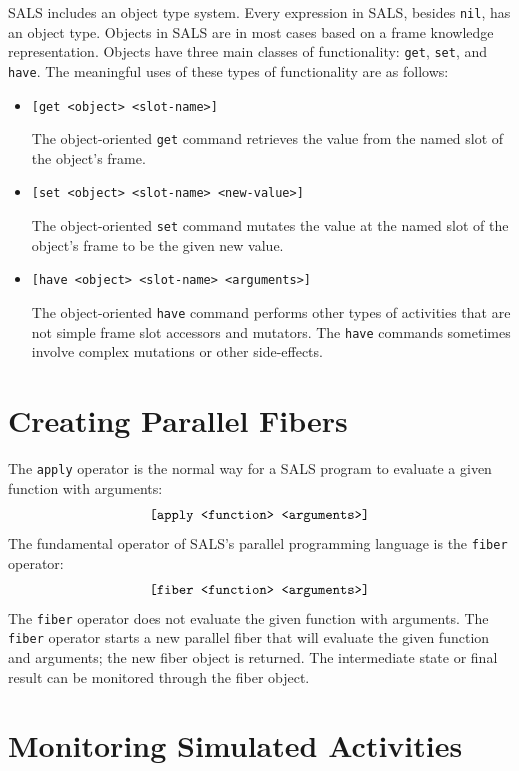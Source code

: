 SALS includes an object type system.  Every expression in SALS,
besides {\tt nil}, has an object type.  Objects in SALS are in most
cases based on a frame knowledge representation.  Objects have three
main classes of functionality: {\tt get}, {\tt set}, and {\tt have}.
The meaningful uses of these types of functionality are as follows:
\begin{itemize}
\item {\tt [get <object> <slot-name>]}

The object-oriented {\tt get} command retrieves the value from the
named slot of the object's frame.
\item {\tt [set <object> <slot-name> <new-value>]}

The object-oriented {\tt set} command mutates the value at the named
slot of the object's frame to be the given new value.
\item {\tt [have <object> <slot-name> <arguments>]}

The object-oriented {\tt have} command performs other types of
activities that are not simple frame slot accessors and mutators.  The
{\tt have} commands sometimes involve complex mutations or other
side-effects.
\end{itemize}




\section{Creating Parallel Fibers}

The {\tt apply} operator is the normal way for a SALS program to
evaluate a given function with arguments:
\begin{equation*}
\text{\tt [apply <function> <arguments>]}
\end{equation*}
The fundamental operator of SALS's parallel programming language is
the {\tt fiber} operator:
\begin{equation*}
\text{\tt [fiber <function> <arguments>]}
\end{equation*}
The {\tt fiber} operator does not evaluate the given function with
arguments.  The {\tt fiber} operator starts a new parallel fiber that
will evaluate the given function and arguments; the new fiber object
is returned.  The intermediate state or final result can be monitored
through the fiber object.

\section{Monitoring Simulated Activities}

